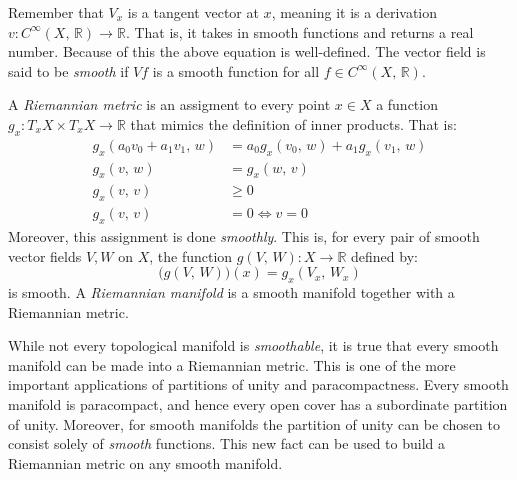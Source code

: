 \documentclass{article}
\theoremstyle{plain}
\theoremstyle{normal}
\begin{document}
        Remember that $V_{x}$ is a tangent vector at $x$, meaning it is a
        derivation $v:C^{\infty}(X,\,\mathbb{R})\rightarrow\mathbb{R}$. That is,
        it takes in smooth functions and returns a real number. Because of this
        the above equation is well-defined.
        The vector field is said to be \textit{smooth} if $Vf$ is a smooth
        function for all $f\in{C}^{\infty}(X,\,\mathbb{R})$.
        \par\hfill\par
        A \textit{Riemannian metric} is an assigment to every point
        $x\in{X}$ a function $g_{x}:T_{x}X\times{T}_{x}X\rightarrow\mathbb{R}$
        that mimics the definition of inner products. That is:
        \begin{align}
            g_{x}(a_{0}v_{0}+a_{1}v_{1},\,w)
            &=a_{0}g_{x}(v_{0},\,w)+a_{1}g_{x}(v_{1},\,w)\tag{Linearity}\\
            g_{x}(v,\,w)&=g_{x}(w,\,v)\tag{Symmetry}\\
            g_{x}(v,\,v)&\geq{0}\tag{Positivity}\\
            g_{x}(v,\,v)&=0\Leftrightarrow{v}=0\tag{Definiteness}
        \end{align}
        Moreover, this assignment is done \textit{smoothly}. This is,
        for every pair of smooth vector fields $V,W$ on $X$, the function
        $g(V,\,W):X\rightarrow\mathbb{R}$ defined by:
        \begin{equation}
            \big(g(V,\,W)\big)(x)=g_{x}(V_{x},\,W_{x})
        \end{equation}
        is smooth. A \textit{Riemannian manifold} is a smooth manifold together
        with a Riemannian metric.
        \par\hfill\par
        While not every topological manifold is \textit{smoothable}, it is true
        that every smooth manifold can be made into a Riemannian metric. This
        is one of the more important applications of partitions of unity and
        paracompactness. Every smooth manifold is paracompact, and hence every
        open cover has a subordinate partition of unity. Moreover, for smooth
        manifolds the partition of unity can be chosen to consist solely of
        \textit{smooth} functions. This new fact can be used to build a
        Riemannian metric on any smooth manifold.
\end{document}
